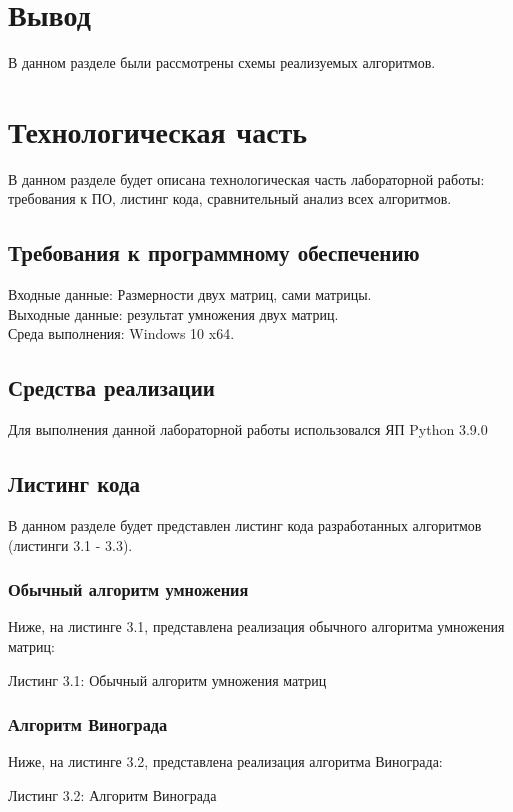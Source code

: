 \documentclass[12pt,a4paper]{article}
\numberwithin{equation}{section}
\begin{document}
\section*{Вывод}
\qquad В данном разделе были рассмотрены схемы реализуемых алгоритмов.
\clearpage


\section{Технологическая часть}
\qquad В данном разделе будет описана технологическая часть лабораторной работы: требования к ПО, листинг кода, сравнительный анализ всех алгоритмов.
\subsection{Требования к программному обеспечению}
Входные данные: Размерности двух матриц, сами матрицы.\\
\qquad Выходные данные: результат умножения двух матриц.\\
\qquad Среда выполнения: Windows 10 x64.\\
\subsection{Средства реализации}
\qquad Для выполнения данной лабораторной работы использовался ЯП Python 3.9.0
\subsection{Листинг кода}
\qquad В данном разделе будет представлен листинг кода разработанных алгоритмов (листинги 3.1 - 3.3).\\
\subsubsection{Обычный алгоритм умножения}
\qquad Ниже, на листинге 3.1,  представлена реализация обычного алгоритма умножения матриц:
\begin{center}
	Листинг 3.1: Обычный алгоритм умножения матриц
	
\end{center}
\clearpage

\subsubsection{Алгоритм Винограда}
\qquad Ниже, на листинге 3.2,  представлена реализация алгоритма Винограда:
\begin{center}
	Листинг 3.2: Алгоритм Винограда
	
\end{center}
\clearpage
\end{document}
